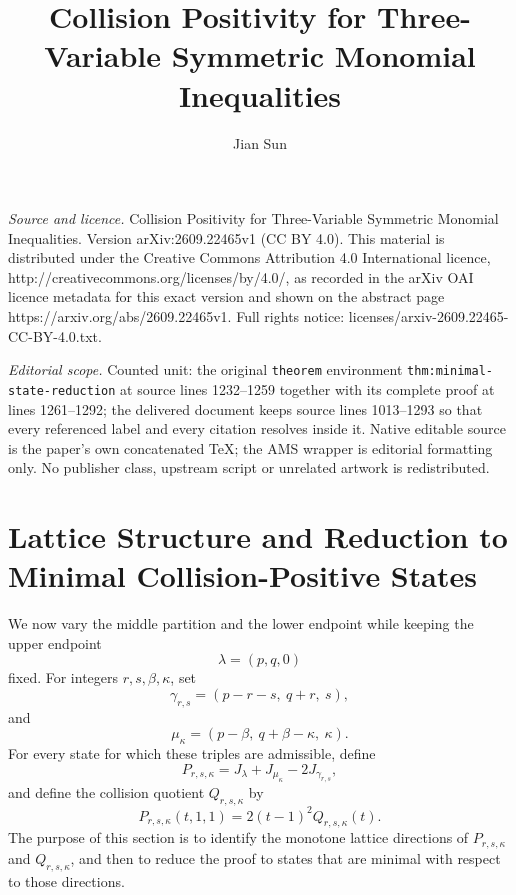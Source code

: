 \documentclass[10pt,a4paper]{amsart}
\begin{document}
\title[Collision Positivity for Three-Variable Symmetric Monomial I]{Collision Positivity for Three-Variable Symmetric Monomial Inequalities}
\author{Jian Sun}
\date{}
\maketitle
\noindent\emph{Source and licence.} Collision Positivity for Three-Variable Symmetric Monomial Inequalities. Version arXiv:2609.22465v1 (CC BY 4.0). This material is distributed under the Creative Commons Attribution 4.0 International licence, http://creativecommons.org/licenses/by/4.0/, as recorded in the arXiv OAI licence metadata for this exact version and shown on the abstract page https://arxiv.org/abs/2609.22465v1. Full rights notice: licenses/arxiv-2609.22465-CC-BY-4.0.txt.\par\smallskip
\noindent\textit{Editorial scope.} Counted unit: the original \texttt{theorem} environment \texttt{thm:minimal-state-reduction} at source lines 1232--1259 together with its complete proof at lines 1261--1292; the delivered document keeps source lines 1013--1293 so that every referenced label and every citation resolves inside it. Native editable source is the paper's own concatenated TeX; the AMS wrapper is editorial formatting only. No publisher class, upstream script or unrelated artwork is redistributed.
\section{Lattice Structure and Reduction to Minimal Collision-Positive States}
\label{sec:monge}

We now vary the middle partition and the lower endpoint while keeping the upper endpoint
\begin{equation*}
\lambda=(p,q,0)
\end{equation*}
fixed.  For integers \(r,s,\beta,\kappa\), set
\begin{equation*}
\gamma_{r,s}
=
(p-r-s,\ q+r,\ s),
\end{equation*}
and
\begin{equation*}
\mu_\kappa
=
(p-\beta,\ q+\beta-\kappa,\ \kappa).
\end{equation*}
For every state for which these triples are admissible, define
\begin{equation*}
P_{r,s,\kappa}
=
J_\lambda+J_{\mu_\kappa}-2J_{\gamma_{r,s}},
\end{equation*}
and define the collision quotient \(Q_{r,s,\kappa}\) by
\begin{equation*}
P_{r,s,\kappa}(t,1,1)
=
2(t-1)^2Q_{r,s,\kappa}(t).
\end{equation*}
The purpose of this section is to identify the monotone lattice directions of
\(P_{r,s,\kappa}\) and \(Q_{r,s,\kappa}\), and then to reduce the proof to states that are minimal with respect to those directions.
\end{document}
